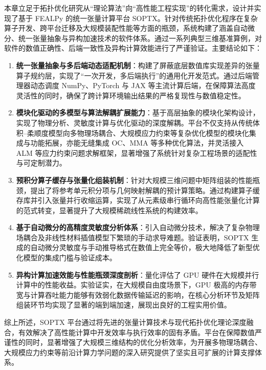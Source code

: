 本章立足于拓扑优化研究从“理论算法”向“高性能工程实现”的转化需求，设计并实现了基于 FEALPy 的统一张量计算平台 SOPTX。针对传统拓扑优化程序在复杂算子开发、跨平台迁移及大规模装配性能等方面的瓶颈，系统构建了涵盖自动微分、统一张量抽象与异构加速技术的软件体系。通过一系列典型三维基准算例，对软件的数值正确性、后端一致性及异构计算效能进行了严谨验证。主要结论如下：
\begin{enumerate}[
	label={（\arabic*）},
	labelsep=0.25em,
	leftmargin=3.2em,
	itemsep=0.4em,
	topsep=0.4em,
	parsep=0pt,
	partopsep=0pt
	]
	\item \textbf{统一张量抽象与多后端动态适配机制}：构建了屏蔽底层数值库实现差异的张量算子规约层，实现了“一次开发，多后端执行”的通用化开发范式。通过后端管理器动态调度 NumPy、PyTorch 与 JAX 等主流计算后端，在保障算法高度灵活性的同时，确保了跨计算环境输出结果的严格复现性与数值稳定性。
	
	\item \textbf{模块化驱动的多模型与算法解耦扩展能力}：基于高层抽象的模块化架构设计，实现了物理分析、灵敏度计算与优化驱动的深度解耦。平台不仅支持从传统体积--柔顺度模型向多物理场耦合、大规模应力约束等复杂优化模型的模块化集成与功能拓展，亦能无缝集成 OC、MMA 等多种优化算法，并灵活接入 ALM 等应力约束问题求解框架，显著增强了系统针对复杂工程场景的适配性与可定制潜力。
	
	\item \textbf{预积分算子缓存与张量化组装机制}：针对大规模三维问题中矩阵组装的性能瓶颈，提出了将参考单元积分项与几何映射解耦的预计算策略。通过构建算子缓存库并引入张量并行收缩运算，实现了从元素级串行循环向高性能张量化计算的范式转变，显著提升了大规模稀疏线性系统的构建效率。
	
	\item \textbf{基于自动微分的高精度灵敏度分析体系}：引入自动微分技术，解决了复杂物理场耦合及非线性材料插值模型下繁琐的手动求导难题。验证表明，SOPTX 生成的自动微分灵敏度与手动推导格式在数值上完全等价，极大地降低了新型优化模型的集成门槛与验证成本。
	
	\item \textbf{异构计算加速效能与性能瓶颈深度剖析}：量化评估了 GPU 硬件在大规模并行计算中的性能收益。实验证实，在大规模自由度场景下，GPU 极高的内存带宽与计算吞吐能力能够有效弱化数据传输延迟的影响，在核心分析环节及矩阵组装环节均实现了显著的端到端加速，展现出良好的工程实用价值。
\end{enumerate}

综上所述，SOPTX 平台通过将先进的张量计算技术与现代拓扑优化理论深度融合，有效解决了高性能计算中开发效率与执行效率的固有矛盾。平台在保障数值严谨性的同时，显著增强了大规模三维结构的优化分析效率，为开展多物理场耦合、大规模应力约束等前沿计算力学问题的深入研究提供了坚实且可扩展的计算支撑体系。


